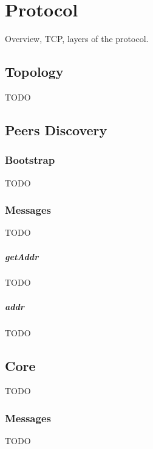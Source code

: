 \chapter{Protocol}
\label{chapter:protocol}
Overview, TCP, layers of the protocol.

\section{Topology}
TODO

\section{Peers Discovery}
\label{sec:discovery}

\subsection{Bootstrap}
TODO

\subsection{Messages}
TODO

\paragraph{getAddr}
TODO

\paragraph{addr}
TODO

\section{Core}
TODO

\subsection{Messages}
TODO
